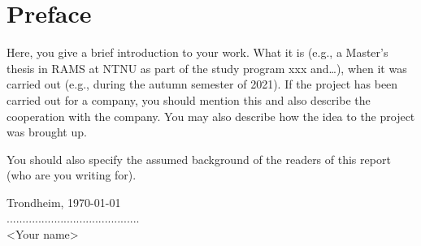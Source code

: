 \newpage
{}
\section*{Preface}
\label{sec:preface}
\begin{info}
    Here, you give a brief introduction to your work. What it is (e.g., a Master's thesis in RAMS at NTNU as part of the study program xxx and\ldots), when it was carried out (e.g., during the autumn semester of 2021). If the project has been carried out for a company, you should mention this and also describe the cooperation with the company. You may also describe how the idea to the project was brought up.

    You should also specify the assumed background of the readers of this report (who are you writing for).
\end{info}



\vspace*{3cm}
\begin{center}
    \centering
    Trondheim, \today\\[1.5pc]
    ..........................................\\[1pc]
    <Your name>
\end{center}
